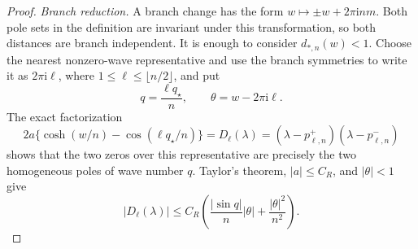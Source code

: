 \documentclass[twoside,10pt]{article}
\numberwithin{equation}{section}
\theoremstyle{slbody}
\theoremstyle{definition}
\theoremstyle{remark}
\begin{document}
\begin{proof}
\emph{Branch reduction.}
A branch change has the form
$w\mapsto\pm w+2\pi\mathrm i n m$.  Both pole sets in the definition
are invariant under this transformation, so both distances are
branch independent.  It is enough to consider $d_{*,n}(w)<1$.
Choose the nearest nonzero-wave representative and use the branch
symmetries to write it as $2\pi\mathrm i\ell$, where
$1\le\ell\le\lfloor n/2\rfloor$, and put
\[
 q=\frac{\ell q_\star}{n},\qquad
 \theta=w-2\pi\mathrm i\ell.
\]
The exact factorization
\begin{equation}\label{eq:critical-w-pole-factorization}
 2a\{\cosh(w/n)-\cos(\ell q_\star/n)\}
 =D_\ell(\lambda)
 =(\lambda-p_{\ell,n}^+)(\lambda-p_{\ell,n}^-)
\end{equation}
shows that the two zeros over this representative are precisely the
two homogeneous poles of wave number $q$.  Taylor's theorem, $|a|\le
C_R$, and $|\theta|<1$ give
\begin{equation}\label{eq:critical-cosh-local-bound}
 |D_\ell(\lambda)|
 \le C_R\left(\frac{|\sin q|}{n}|\theta|
                  +\frac{|\theta|^2}{n^2}\right).
\end{equation}


\end{proof}
\end{document}

